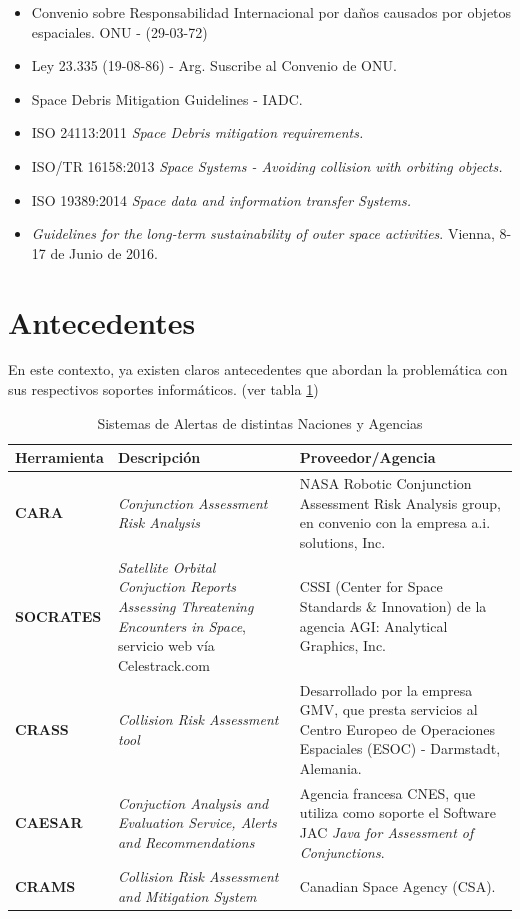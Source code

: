 \begin{itemize} 
\item Convenio sobre Responsabilidad Internacional por da\~nos causados por objetos espaciales. ONU - (29-03-72)
\item Ley 23.335 (19-08-86) - Arg. Suscribe al Convenio de ONU.
\item Space Debris Mitigation Guidelines - IADC.
\item ISO 24113:2011 {\it{Space Debris mitigation requirements.}}
\item ISO/TR 16158:2013 {\it{Space Systems - Avoiding collision with orbiting objects.}}
\item ISO 19389:2014 {\it{Space data and information transfer Systems.}}
\item {\it{Guidelines for the long-term sustainability of outer space activities}}. Vienna, 8-17 de Junio de 2016.
\end{itemize}

\section{Antecedentes}
En este contexto, ya existen claros antecedentes que abordan la problem\'atica con sus respectivos soportes inform\'aticos. (ver tabla \ref{tab:sisal})
\begin{table}[!h]
\centering
\begin{tabular}{|l|p{5cm}|p{6cm}|}
\hline
Herramienta & Descripci\'on & Proveedor/Agencia\\
\hline
{\bf{CARA}} & {\it{Conjunction Assessment Risk Analysis}} & NASA Robotic Conjunction Assessment Risk Analysis group, en convenio con la empresa a.i. solutions, Inc.\\
\hline
{\bf{SOCRATES}} & {\it{Satellite Orbital Conjuction Reports Assessing Threatening Encounters in Space}}, servicio web v\'ia Celestrack.com & CSSI (Center for Space Standards \& Innovation) de la agencia AGI: Analytical Graphics, Inc.\\
\hline
{\bf{CRASS}} & {\it{Collision Risk Assessment tool}} & Desarrollado por la
empresa GMV, que presta servicios al Centro Europeo de Operaciones
Espaciales (ESOC) - Darmstadt, Alemania. \cite{alarconRodriguez}\\
\hline
{\bf{CAESAR}} & {\it{Conjuction Analysis and Evaluation Service, Alerts and Recommendations}} & Agencia francesa CNES, que utiliza como soporte el Software JAC {\it{Java for Assessment of Conjunctions}}. \cite{laporte}\\
\hline
{\bf{CRAMS}} & {\it{Collision Risk Assessment and Mitigation System}} & Canadian Space Agency (CSA). \cite{babiker}\\
\hline
\end{tabular}
\caption[Sistemas de Alerta]{Sistemas de Alertas de distintas Naciones y Agencias}
\label{tab:sisal}
\end{table}

